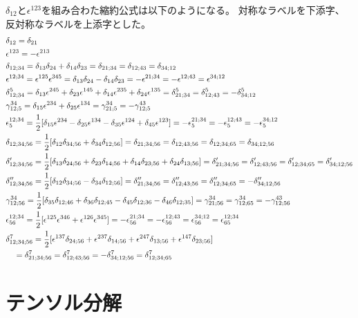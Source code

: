 \documentclass[11pt]{easymemo}
\begin{document}
$\delta_{12}$と$\epsilon^{123}$を組み合わた縮約公式は以下のようになる。
対称なラベルを下添字、反対称なラベルを上添字とした。
\begin{align}
&
\delta_{12}=\delta_{21}
\\&
\epsilon^{123}=-\epsilon^{213}
\\&
\delta_{12;34}
=\delta_{13}\delta_{24}+\delta_{14}\delta_{23}
=\delta_{21;34}=\delta_{12;43}=\delta_{34;12}
\cr&
\epsilon^{12;34}
=\epsilon^{125}\epsilon^{345}
=\delta_{13}\delta_{24}-\delta_{14}\delta_{23}
=-\epsilon^{21;34}=-\epsilon^{12;43}=\epsilon^{34;12}
\\&
\delta_{12;34}^5
=\delta_{13}\epsilon^{245}+\delta_{23}\epsilon^{145}+\delta_{14}\epsilon^{235}+\delta_{24}\epsilon^{135}
=\delta_{21;34}^5=\delta_{12;43}^5=-\delta_{34;12}^5
\cr&
\gamma_{12;5}^{34}
=\delta_{15}\epsilon^{234}+\delta_{25}\epsilon^{134}
=\gamma_{21;5}^{34}=-\gamma_{12;5}^{43}
\cr&
\epsilon_5^{12;34}
=\frac{1}{2}[\delta_{15}\epsilon^{234}-\delta_{25}\epsilon^{134}-\delta_{35}\epsilon^{124}+\delta_{45}\epsilon^{123}]
=-\epsilon_{5}^{21;34}=-\epsilon_{5}^{12;43}=-\epsilon_{5}^{34;12}
\\&
\delta_{12;34;56}
=\frac{1}{2}[\delta_{12}\delta_{34;56}+\delta_{34}\delta_{12;56}]
=\delta_{21;34;56}=\delta_{12;43;56}=\delta_{12;34;65}=\delta_{34;12;56}
\cr&
\delta_{12;34;56}'
=\frac{1}{2}[\delta_{13}\delta_{24;56}+\delta_{23}\delta_{14;56}+\delta_{14}\delta_{23;56}+\delta_{24}\delta_{13;56}]
=\delta_{21;34;56}'=\delta_{12;43;56}'=\delta_{12;34;65}'=\delta_{34;12;56}'
\cr&
\delta_{12;34;56}''=\frac{1}{2}[
\delta_{12}\delta_{34;56}-\delta_{34}\delta_{12;56}
]
=\delta_{21;34;56}''=\delta_{12;43;56}''=\delta_{12;34;65}''=-\delta_{34;12;56}''
\cr&
\gamma_{12;56}^{34}
=\frac{1}{2}[\delta_{35}\delta_{12;46}+\delta_{36}\delta_{12;45}-\delta_{45}\delta_{12;36}-\delta_{46}\delta_{12;35}]
=\gamma_{21;56}^{34}=\gamma_{12;65}^{34}=-\gamma_{12;56}^{43}
\cr&
\epsilon_{56}^{12;34}
=\frac{1}{2}[\epsilon^{125}\epsilon^{346}+\epsilon^{126}\epsilon^{345}]
=-\epsilon_{56}^{21;34}=-\epsilon_{56}^{12;43}=\epsilon_{56}^{34;12}=\epsilon_{65}^{12;34}
\\&
\delta_{12;34;56}^{7}
=\frac{1}{2}[\epsilon^{137}\delta_{24;56} +\epsilon^{237}\delta_{14;56} +\epsilon^{247}\delta_{13;56} +\epsilon^{147}\delta_{23;56}]
\cr&\quad
=\delta_{21;34;56}^{7}=\delta_{12;43;56}^{7}=-\delta_{34;12;56}^{7}=\delta_{12;34;65}^{7}
\end{align}


\section{テンソル分解}
\end{document}
